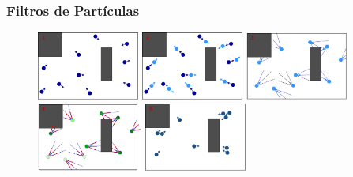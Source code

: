 \begin{frame}\frametitle{Filtros de Partículas}
  \begin{figure}
    \centering
    \includegraphics[width=0.30\textwidth]{Figures/MotionPlanning/ParticleFilter1.pdf}
    \includegraphics[width=0.30\textwidth]{Figures/MotionPlanning/ParticleFilter2.pdf}
    \includegraphics[width=0.30\textwidth]{Figures/MotionPlanning/ParticleFilter3.pdf}
    \includegraphics[width=0.31\textwidth]{Figures/MotionPlanning/ParticleFilter4.pdf}
    \includegraphics[width=0.30\textwidth]{Figures/MotionPlanning/ParticleFilter5.pdf}
  \end{figure}
\end{frame}


